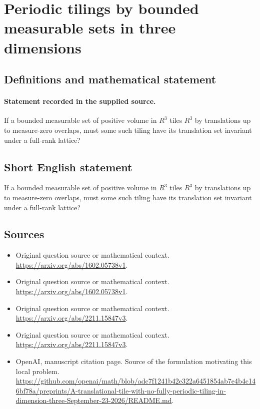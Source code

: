 \documentclass[11pt]{article}
\begin{document}
\section*{Periodic tilings by bounded measurable sets in three dimensions}\label{statement}
\subsection{Definitions and mathematical statement}
\paragraph{Statement recorded in the supplied source.}
If a bounded measurable set of positive volume in $R^3$ tiles $R^3$ by translations up to measure-zero overlaps, must some such tiling have its translation set invariant under a full-rank lattice?
\subsection{Short English statement}
If a bounded measurable set of positive volume in $R^3$ tiles $R^3$ by translations up to measure-zero overlaps, must some such tiling have its translation set invariant under a full-rank lattice?
\subsection{Sources}
\begin{itemize}
\item[S1] Original question source or mathematical context.
\url{https://arxiv.org/abs/1602.05738v1}.
\item[S2] Original question source or mathematical context.
\url{https://arxiv.org/abs/1602.05738v1}.
\item[S3] Original question source or mathematical context.
\url{https://arxiv.org/abs/2211.15847v3}.
\item[S4] Original question source or mathematical context.
\url{https://arxiv.org/abs/2211.15847v3}.
\item[S5] OpenAI, manuscript citation page. Source of the formulation motivating this local problem.
\url{https://github.com/openai/math/blob/adc7f1241b42e322a6451854ab7e4b4c146bf78a/preprints/A-translational-tile-with-no-fully-periodic-tiling-in-dimension-three-September-23-2026/README.md}.
\end{itemize}
\end{document}
